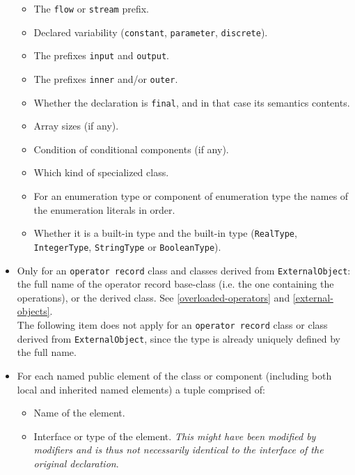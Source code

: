 \begin{itemize}
  \begin{itemize}
  \item
    The \lstinline!flow! or \lstinline!stream! prefix.
  \item
    Declared variability (\lstinline!constant!, \lstinline!parameter!, \lstinline!discrete!).
  \item
    The prefixes \lstinline!input! and \lstinline!output!.
  \item
    The prefixes \lstinline!inner! and/or \lstinline!outer!.
  \item
    Whether the declaration is \lstinline!final!, and in that case its semantics
    contents.
  \item
    Array sizes (if any).
  \item
    Condition of conditional components (if any).
  \item
    Which kind of specialized class.
  \item
    For an enumeration type or component of enumeration type the names
    of the enumeration literals in order.
  \item
    Whether it is a built-in type and the built-in type (\lstinline!RealType!,
    \lstinline!IntegerType!, \lstinline!StringType! or \lstinline!BooleanType!).
  \end{itemize}
\item
  Only for an \lstinline!operator record! class and classes derived from
  \lstinline!ExternalObject!: the full name of the operator record base-class (i.e.
  the one containing the operations), or the derived class. See
  \autoref{overloaded-operators} and \autoref{external-objects}.\\
  The following item does not apply for an \lstinline!operator record! class or
  class derived from \lstinline!ExternalObject!, since the type is already uniquely
  defined by the full name.
\item
  For each named public element of the class or component (including
  both local and inherited named elements) a tuple comprised of:
  \begin{itemize}
  \item
    Name of the element.
  \item
    Interface or type of the element. \emph{This might have been
    modified by modifiers and is thus not necessarily identical to the
    interface of the original declaration}.
  \end{itemize}
\end{itemize}

